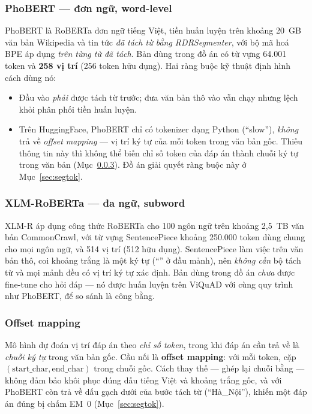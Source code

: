 \subsubsection{PhoBERT --- đơn ngữ, word-level}

PhoBERT \cite{nguyen2020phobert} là RoBERTa đơn ngữ tiếng Việt, tiền huấn luyện trên khoảng
20~GB văn bản Wikipedia và tin tức \emph{đã tách từ bằng RDRSegmenter}, với bộ mã hoá BPE
\cite{sennrich2016bpe} áp dụng \emph{trên từng từ đã tách}. Bản 
dùng trong đồ án có từ vựng 64.001 token và \textbf{258 vị trí} (256 token hữu dụng). Hai
ràng buộc kỹ thuật định hình cách dùng nó:

\begin{itemize}
  \item Đầu vào \emph{phải} được tách từ trước; đưa văn bản thô vào vẫn chạy nhưng lệch khỏi
        phân phối tiền huấn luyện.
  \item Trên HuggingFace, PhoBERT chỉ có tokenizer dạng Python (``slow''), \emph{không} trả về
        \emph{offset mapping} --- vị trí ký tự của mỗi token trong văn bản gốc. Thiếu thông
        tin này thì không thể biến chỉ số token của đáp án thành chuỗi ký tự trong văn bản
        (Mục~\ref{sec:offsets}). Đồ án giải quyết ràng buộc này ở Mục~\ref{sec:segtok}.
\end{itemize}

\subsubsection{XLM-RoBERTa --- đa ngữ, subword}

XLM-R \cite{conneau2020xlmr} áp dụng công thức RoBERTa cho 100 ngôn ngữ trên khoảng 2,5~TB
văn bản CommonCrawl, với từ vựng SentencePiece \cite{kudo2018sentencepiece} khoảng 250.000
token dùng chung cho mọi ngôn ngữ, và 514 vị trí (512 hữu dụng). SentencePiece làm việc trên
văn bản thô, coi khoảng trắng là một ký tự (``\code{\_}'' ở đầu mảnh), nên \emph{không cần} bộ
tách từ và mọi mảnh đều có vị trí ký tự xác định. Bản  dùng
trong đồ án \emph{chưa} được fine-tune cho hỏi đáp --- nó được huấn luyện trên ViQuAD với cùng
quy trình như PhoBERT, để so sánh là công bằng.

\subsubsection{Offset mapping}
\label{sec:offsets}

Mô hình dự đoán vị trí đáp án theo \emph{chỉ số token}, trong khi đáp án cần trả về là
\emph{chuỗi ký tự} trong văn bản gốc. Cầu nối là \textbf{offset mapping}: với mỗi token, cặp
$(\text{start\_char}, \text{end\_char})$ trong chuỗi gốc. Cách thay thế --- ghép lại chuỗi bằng
 --- không đảm bảo khôi phục đúng dấu tiếng Việt và khoảng trắng gốc,
và với PhoBERT còn trả về dấu gạch dưới của bước tách từ (``Hà\_Nội''), khiến một đáp án đúng
bị chấm EM~0 (Mục~\ref{sec:segtok}).

